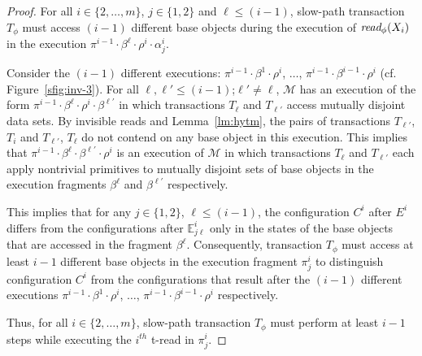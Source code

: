 \begin{proof}
%
%
For all $i\in \{2,\ldots, m\}$, $j\in \{1,2\}$ and $\ell \leq (i-1)$, slow-path transaction $T_{\phi}$ must access
$(i-1)$ different base objects during the execution of $\textit{read}_{\phi}(X_i)$ in the execution
$\pi^{i-1}\cdot \beta^{\ell}\cdot \rho^i \cdot \alpha_j^i$.

Consider the $(i-1)$ different executions: 
$\pi^{i-1}\cdot\beta^{1}\cdot \rho^i$, $\ldots$, $\pi^{i-1}\cdot\beta^{i-1}\cdot \rho^i$ (cf. Figure~\ref{sfig:inv-3}).
For all $\ell, \ell' \leq (i-1)$;$\ell' \neq \ell$, 
$\mathcal{M}$ has an execution of the form $\pi^{i-1}\cdot \beta^{\ell}\cdot \rho^i \cdot \beta^{\ell'}$
in which transactions $T_{\ell}$ and $T_{\ell'}$ access mutually disjoint data sets.
By invisible reads and Lemma~\ref{lm:hytm}, the pairs of transactions $T_{\ell'}$, $T_{i}$ and $T_{\ell'}$, $T_{\ell}$
do not contend on any base object in this execution.
This implies that $\pi^{i-1}\cdot \beta^{\ell} \cdot \beta^{\ell'} \cdot \rho^i$ is an execution of $\mathcal{M}$ in which
transactions $T_{\ell}$ and $T_{\ell'}$ each apply nontrivial primitives
to mutually disjoint sets of base objects in the execution fragments $\beta^{\ell}$ and $\beta^{\ell'}$ respectively.

This implies that for any $j\in \{1,2\}$, $\ell \leq (i-1)$, the configuration $C^i$ after $E^i$ differs from the configurations
after $\mathbb{E}_{j\ell}^{i}$ only in the states of the base objects that are accessed in the fragment $\beta^{\ell}$.
Consequently, transaction $T_{\phi}$ must access at least $i-1$ different base objects
in the execution fragment $\pi_j^i$
to distinguish configuration $C^i$ from the configurations
that result after the $(i-1)$ different executions 
$\pi^{i-1}\cdot\beta^{1}\cdot \rho^i$, $\ldots$, $\pi^{i-1}\cdot\beta^{i-1}\cdot \rho^i$ respectively.

Thus, for all $i \in \{2,\ldots, m\}$, slow-path transaction $T_{\phi}$ must perform at least $i-1$ steps 
while executing the $i^{th}$ t-read in $\pi_{j}^i$.
\end{proof}
%
%